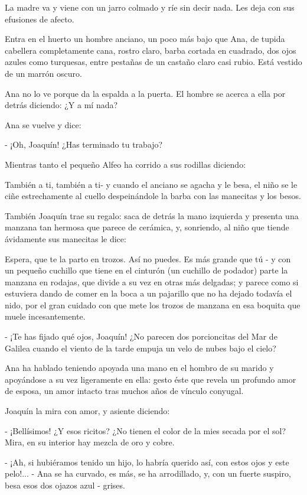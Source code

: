 \documentclass[12pt]{book} %
\begin{document}
La madre va y viene con un jarro colmado y ríe sin decir nada. Les deja con sus efusiones de afecto. 

Entra en el huerto un hombre anciano, un poco más bajo que Ana, de tupida cabellera completamente cana, rostro claro, barba cortada en cuadrado, dos ojos azules como turquesas, entre pestañas de un castaño claro casi rubio. Está vestido de un marrón oscuro. 

Ana no lo ve porque da la espalda a la puerta. El hombre se acerca a ella por detrás diciendo: ¿Y a mí nada? 

Ana se vuelve y dice:

- ¡Oh, Joaquín! ¿Has terminado tu trabajo? 

 Mientras tanto el pequeño Alfeo ha corrido a sus rodillas diciendo: 

También a ti, también a ti- y cuando el anciano se agacha y le besa, el niño se le ciñe estrechamente al cuello despeinándole la barba con las manecitas y los besos. 

También Joaquín trae su regalo: saca de detrás la mano izquierda y presenta una manzana tan hermosa que parece de cerámica, y, sonriendo, al niño que tiende ávidamente sus manecitas le dice: 

Espera, que te la parto en trozos. Así no puedes. Es más grande que tú - y con un pequeño cuchillo que tiene en el cinturón (un cuchillo de podador) parte la manzana en rodajas, que divide a su vez en otras más delgadas; y parece como si estuviera dando de comer en la boca a un pajarillo que no ha dejado todavía el nido, por el gran cuidado con que mete los trozos de manzana en esa boquita que muele incesantemente. 

- ¡Te has fijado qué ojos, Joaquín! ¿No parecen dos porcioncitas del Mar de Galilea cuando el viento de la tarde empuja un velo de nubes bajo el cielo? 

Ana ha hablado teniendo apoyada una mano en el hombro de su marido y apoyándose a su vez ligeramente en ella: gesto éste que revela un profundo amor de esposa, un amor intacto tras muchos años de vínculo conyugal. 

Joaquín la mira con amor, y asiente diciendo: 

- ¡Bellísimos! ¿Y esos ricitos? ¿No tienen el color de la mies secada por el sol? Mira, en su interior hay mezcla de oro y cobre. 

- ¡Ah, si hubiéramos tenido un hijo, lo habría querido así, con estos ojos y este pelo!... - Ana se ha curvado, es más, se ha arrodillado, y, con un fuerte suspiro, besa esos dos ojazos azul - grises. 
\end{document}
